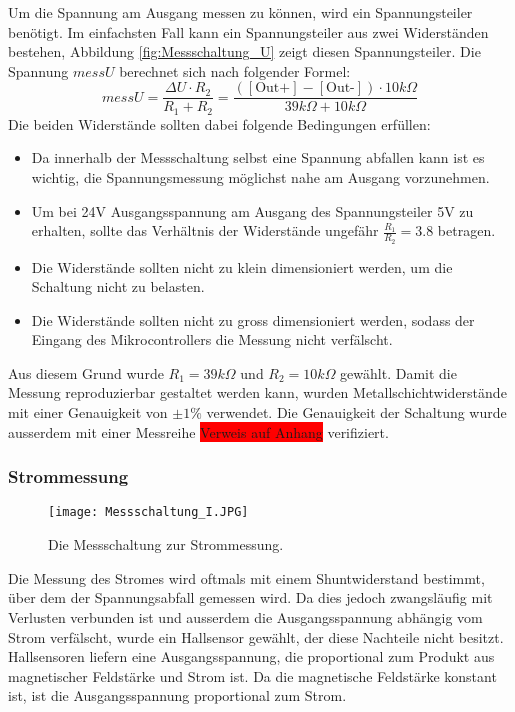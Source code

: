 Um die Spannung am Ausgang messen zu können, wird ein Spannungsteiler benötigt. Im einfachsten Fall kann ein Spannungsteiler aus zwei Widerständen bestehen, Abbildung \ref{fig:Messschaltung_U} zeigt diesen Spannungsteiler. Die Spannung $messU$ berechnet sich nach folgender Formel:
\begin{equation}
	messU=\frac{\Delta U\cdot R_2}{R_1+R_2}=\frac{\left(\left[\text{Out+}\right]-\left[\text{Out-}\right]\right)\cdot10k\Omega}{39k\Omega +10k\Omega}
\label{eq:messU}
\end{equation}
 Die beiden Widerstände sollten dabei folgende Bedingungen erfüllen:
\begin{itemize}
	\item Da innerhalb der Messschaltung selbst eine Spannung abfallen kann ist es wichtig, die Spannungsmessung möglichst nahe am Ausgang vorzunehmen.
	\item Um bei 24V Ausgangsspannung am Ausgang des Spannungsteiler 5V zu erhalten, sollte das Ver\-hält\-nis der Widerstände ungefähr $\frac{R_1}{R_2}=3.8$ betragen.
	\item Die Widerstände sollten nicht zu klein dimensioniert werden, um die Schaltung nicht zu belasten.
	\item Die Widerstände sollten nicht zu gross dimensioniert werden, sodass der Eingang des Mikrocontrollers die Messung nicht verfälscht.
\end{itemize}
Aus diesem Grund wurde $R_1=39k\Omega$ und $R_2=10k\Omega$ gewählt. Damit die Messung reproduzierbar gestaltet werden kann, wurden Metallschichtwiderstände mit einer Genauigkeit von $\pm 1\%$ verwendet. Die Genauigkeit der Schaltung wurde ausserdem mit einer Messreihe \colorbox{red}{Verweis auf Anhang} verifiziert.

\subsubsection{Strommessung}
\begin{figure}[h]
	\centering
		\texttt{[image: Messschaltung\_I.JPG]}
	\caption{Die Messschaltung zur Strommessung.}
	\label{fig:Messschaltung_I}
\end{figure}
Die Messung des Stromes wird oftmals mit einem Shuntwiderstand bestimmt, über dem der Spannungsabfall gemessen wird. Da dies jedoch zwangsläufig mit Verlusten verbunden ist und ausserdem die Ausgangsspannung abhängig vom Strom verfälscht, wurde ein Hallsensor gewählt, der diese Nachteile nicht besitzt. Hallsensoren liefern eine Ausgangsspannung, die proportional zum Produkt aus magnetischer Feldstärke und Strom ist. Da die magnetische Feldstärke konstant ist, ist die Ausgangsspannung proportional zum Strom.

